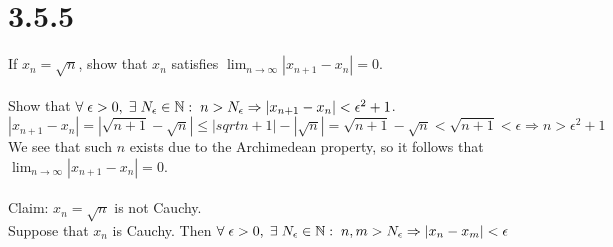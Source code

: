 \documentclass[11pt]{article}
\begin{document}
\section*{3.5.5}
If $x_n=\sqrt{n}$, show that $x_n$ satisfies $\lim_{n\to\infty}|x_{n+1}-x_n| = 0$. \\
\\
Show that $\forall \hspace{1mm} \epsilon > 0, \hspace{1mm} \exists \hspace{1mm} N_{\epsilon}\in\mathbb{N}: \hspace{1mm} n>N_{\epsilon} \Rightarrow |x_{n+1} - x_n| < \epsilon^2 + 1$.
\[|x_{n+1}-x_n|=|\sqrt{n+1}-\sqrt{n}| \leq |sqrt{n+1}|-|\sqrt{n}|=\sqrt{n+1}-\sqrt{n} < \sqrt{n+1} < \epsilon \Rightarrow n > \epsilon^2 + 1\]
We see that such $n$ exists due to the Archimedean property, so it follows that $\lim_{n\to\infty}|x_{n+1}-x_n|=0$. \\
\\
Claim: $x_n=\sqrt{n}$ is not Cauchy. \\
Suppose that $x_n$ is Cauchy. Then $\forall \hspace{1mm}\epsilon > 0, \hspace{1mm}\exists\hspace{1mm} N_{\epsilon} \in \mathbb{N}: \hspace{1mm} n,m > N_{\epsilon} \Rightarrow |x_n-x_m| < \epsilon$
\end{document}
